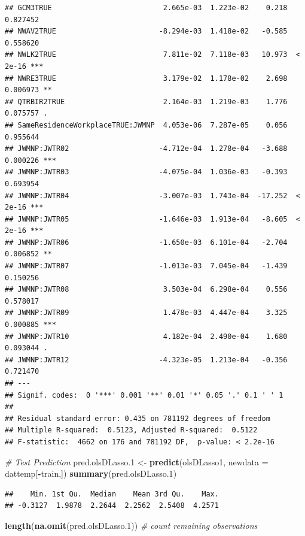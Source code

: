 \documentclass[
]{article}
\newenvironment{Shaded}{\begin{snugshade}}{\end{snugshade}}
\newcommand{\CommentTok}[1]{\textcolor[rgb]{0.56,0.35,0.01}{\textit{#1}}}
\newcommand{\DataTypeTok}[1]{\textcolor[rgb]{0.13,0.29,0.53}{#1}}
\newcommand{\FloatTok}[1]{\textcolor[rgb]{0.00,0.00,0.81}{#1}}
\newcommand{\KeywordTok}[1]{\textcolor[rgb]{0.13,0.29,0.53}{\textbf{#1}}}
\newcommand{\NormalTok}[1]{#1}
\newcommand{\OperatorTok}[1]{\textcolor[rgb]{0.81,0.36,0.00}{\textbf{#1}}}
\newcommand{\StringTok}[1]{\textcolor[rgb]{0.31,0.60,0.02}{#1}}
\begin{document}
\begin{verbatim}
## GCM3TRUE                          2.665e-03  1.223e-02    0.218 0.827452    
## NWAV2TRUE                        -8.294e-03  1.418e-02   -0.585 0.558620    
## NWLK2TRUE                         7.811e-02  7.118e-03   10.973  < 2e-16 ***
## NWRE3TRUE                         3.179e-02  1.178e-02    2.698 0.006973 ** 
## QTRBIR2TRUE                       2.164e-03  1.219e-03    1.776 0.075757 .  
## SameResidenceWorkplaceTRUE:JWMNP  4.053e-06  7.287e-05    0.056 0.955644    
## JWMNP:JWTR02                     -4.712e-04  1.278e-04   -3.688 0.000226 ***
## JWMNP:JWTR03                     -4.075e-04  1.036e-03   -0.393 0.693954    
## JWMNP:JWTR04                     -3.007e-03  1.743e-04  -17.252  < 2e-16 ***
## JWMNP:JWTR05                     -1.646e-03  1.913e-04   -8.605  < 2e-16 ***
## JWMNP:JWTR06                     -1.650e-03  6.101e-04   -2.704 0.006852 ** 
## JWMNP:JWTR07                     -1.013e-03  7.045e-04   -1.439 0.150256    
## JWMNP:JWTR08                      3.503e-04  6.298e-04    0.556 0.578017    
## JWMNP:JWTR09                      1.478e-03  4.447e-04    3.325 0.000885 ***
## JWMNP:JWTR10                      4.182e-04  2.490e-04    1.680 0.093044 .  
## JWMNP:JWTR12                     -4.323e-05  1.213e-04   -0.356 0.721470    
## ---
## Signif. codes:  0 '***' 0.001 '**' 0.01 '*' 0.05 '.' 0.1 ' ' 1
## 
## Residual standard error: 0.435 on 781192 degrees of freedom
## Multiple R-squared:  0.5123, Adjusted R-squared:  0.5122 
## F-statistic:  4662 on 176 and 781192 DF,  p-value: < 2.2e-16
\end{verbatim}

\begin{Shaded}
\begin{Highlighting}[]
\CommentTok{# Test Prediction}
\NormalTok{pred.olsDLasso}\FloatTok{.1}\NormalTok{ <-}\StringTok{ }\KeywordTok{predict}\NormalTok{(olsDLasso1, }\DataTypeTok{newdata =}\NormalTok{ dattemp[}\OperatorTok{-}\NormalTok{train,])}
\KeywordTok{summary}\NormalTok{(pred.olsDLasso}\FloatTok{.1}\NormalTok{)}
\end{Highlighting}
\end{Shaded}

\begin{verbatim}
##    Min. 1st Qu.  Median    Mean 3rd Qu.    Max. 
## -0.3127  1.9878  2.2644  2.2562  2.5408  4.2571
\end{verbatim}

\begin{Shaded}
\begin{Highlighting}[]
\KeywordTok{length}\NormalTok{(}\KeywordTok{na.omit}\NormalTok{(pred.olsDLasso}\FloatTok{.1}\NormalTok{)) }\CommentTok{# count remaining observations}
\end{Highlighting}
\end{Shaded}
\end{document}
